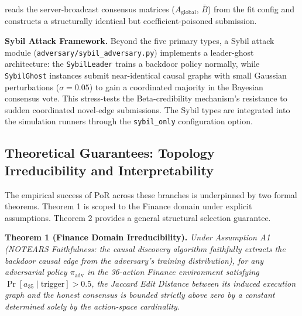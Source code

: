 \documentclass[journal]{IEEEtran}
\begin{document}
\begin{itemize}
reads the server-broadcast consensus matrices ($A_{\text{global}}$, $\bar{B}$) from the fit config and constructs a structurally identical but coefficient-poisoned submission. \end{itemize}

\textbf{Sybil Attack Framework.} Beyond the five primary types, a Sybil attack module (\texttt{adversary/sybil\_adversary.py}) implements a leader-ghost architecture: the \texttt{SybilLeader} trains a backdoor policy normally, while \texttt{SybilGhost} instances submit near-identical causal graphs with small Gaussian perturbations ($\sigma = 0.05$) to gain a coordinated majority in the Bayesian consensus vote. This stress-tests the Beta-credibility mechanism's resistance to sudden coordinated novel-edge submissions. The Sybil types are integrated into the simulation runners through the \texttt{sybil\_only} configuration option.

\subsection{Theoretical Guarantees: Topology Irreducibility and Interpretability}
\label{ssec:finance_proof}

The empirical success of PoR across these branches is underpinned by two formal theorems. Theorem 1 is scoped to the Finance domain under explicit assumptions. Theorem 2 provides a general structural selection guarantee.

\textbf{Theorem 1 (Finance Domain Irreducibility).} \emph{Under Assumption A1 (NOTEARS Faithfulness: the causal discovery algorithm faithfully extracts the backdoor causal edge from the adversary's training distribution), for any adversarial policy $\pi_\text{adv}$ in the 36-action Finance environment satisfying $\Pr[a_{35} \mid \text{trigger}] > 0.5$, the Jaccard Edit Distance between its induced execution graph and the honest consensus is bounded strictly above zero by a constant determined solely by the action-space cardinality.}
\end{document}
